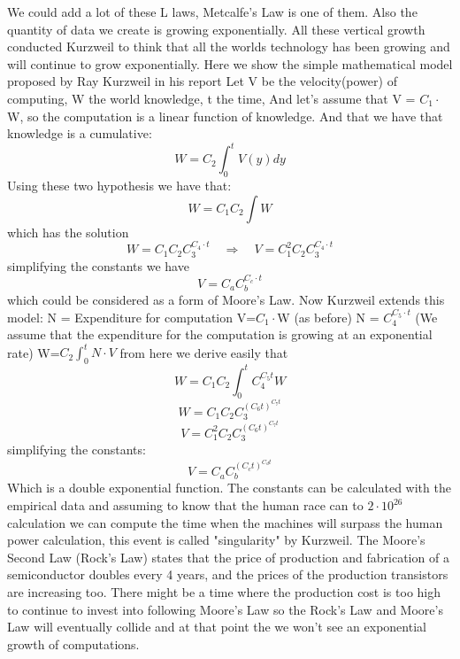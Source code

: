 \documentclass[12pt, a4page]{article}
\begin{document}
We could add a lot of these L laws, Metcalfe's Law is one of them. Also the quantity of data we create is growing exponentially. All these vertical growth conducted Kurzweil \cite{Kurzweil} to think that all the worlds technology has been growing and will continue to grow exponentially. Here we show the simple mathematical model proposed by Ray Kurzweil in his report \cite{Kurzweil}\newline
Let V be the velocity(power) of computing,\newline
W the world knowledge,\newline
t the time,\newline
And let's assume that V = $C_1\cdot$W, so the computation is a linear function of knowledge. And that we have that knowledge is a cumulative: $$W=C_2\int_0^t V(y)dy$$
Using these two hypothesis we have that:
$$W = C_1 C_2 \int W$$ which has the solution
$$W = C_1 C_2 C_3^{ C_4\cdot t} \quad \Rightarrow \quad V = C_1^2 C_2 C_3^{C_4\cdot t}$$
simplifying the constants we have
$$ V=C_a C_b ^{ C_c \cdot t} $$
which could be considered as a form of Moore's Law. Now Kurzweil extends this model:\newline
N = Expenditure for computation\newline
V=$C_1\cdot$W (as before)\newline
N = $C_4^{C_5\cdot t}$ (We assume that the expenditure for the computation is growing at an exponential rate) \newline
W=$C_2 \int_0^t N\cdot V$\newline
from here we derive easily that
$$ W=C_1 C_2 \int_0^t C_4^{C_5 t} W  $$
$$ W = C_1 C_2 C_3^{(C_6 t)^{C_7 t}} $$
$$ V = C_1^2 C_2 C_3^{(C_6 t)^{C_7 t}}  $$
simplifying the constants:
$$ V = C_a C_b^{(C_c t)^{C_d t}} $$
Which is a double exponential function. The constants can be calculated with the empirical data and assuming to know that the human race can to $2\cdot 10^{26}$ calculation we can compute the time when the machines will surpass the human power calculation, this event is called "singularity" by Kurzweil. \newline
The Moore's Second Law (Rock's Law) states that the price of production and fabrication of a semiconductor doubles every 4 years, and the prices of the production transistors are increasing too. There might be a time where the production cost is too high to continue to invest into following Moore's Law so the Rock's Law and Moore's Law will eventually collide and at that point the we won't see an exponential growth of computations. \newline
\end{document}
